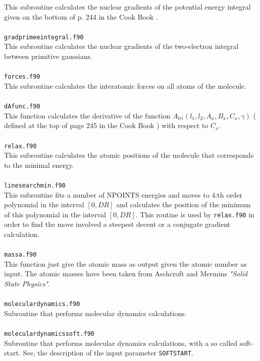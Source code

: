 \documentclass[a4paper,twoside,openany]{book}
\begin{document}
{{This subroutine  calculates the nuclear gradients of the potential energy integral given on the
bottom of p. 244 in the Cook Book \cite{Cook}. \\ \\
\texttt{gradprimeeintegral.f90}\\
This subroutine calculates the nuclear gradients of the two-electron integral between  primitive gaussians. \\ \\
 \texttt{forces.f90}\\
 This subroutine calculates the interatomic forces on all atoms of the molecule. \\ \\
 \texttt{dAfunc.f90}\\
This  function calculates the derivative of the function $A_{lri}(l_{1},l_{2},A_{x},B_{x},C_{x},\gamma)$ ( defined at the top of page 245 in the Cook Book \cite{Cook}) 
with respect to $C_{x}$. \\ \\
\texttt{relax.f90}\\
This subroutine calculates the atomic positions of the molecule that corresponds to the minimal energy.\\ \\
\texttt{linesearchmin.f90}\\ 
This subroutine fits a number of NPOINTS energies and moves 
to 4:th order polynomial in the interval  $[0,DR]$ and calculates
the position of the minimum of this polynomial in the interval $[0,DR]$. This routine is used by \texttt{relax.f90} in order to find the move involved  a steepest decent or a conjugate gradient 
calculation. \\ \\
\texttt{massa.f90}\\
This function just give the atomic mass as output given
the atomic number as input. The atomic masses have been 
taken from Aschcroft and Mermins {\it "Solid State Physics"}. \\ \\
\texttt{moleculardynamics.f90} \\
Subroutine that performs  molecular dynamics calculations. \\ \\
\texttt{moleculardynamicssoft.f90}\\
Subroutine that performs  molecular dynamics calculations, with a so called soft-start. See, the description of the input parameter \texttt{SOFTSTART}. \\ \\
}}
\end{document}
